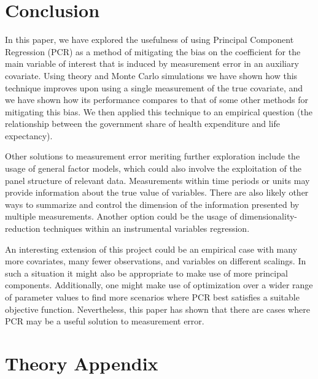 \documentclass[10pt]{article}
\begin{document}
        

    \section*{Conclusion}
        
        In this paper, we have explored the usefulness of using Principal Component Regression (PCR) as a method of mitigating the bias on the coefficient for the main variable of interest that is induced by measurement error in an auxiliary covariate. Using theory and Monte Carlo simulations we have shown how this technique improves upon using a single measurement of the true covariate, and we have shown how its performance compares to that of some other methods for mitigating this bias. We then applied this technique to an empirical question (the relationship between the government share of health expenditure and life expectancy).

        Other solutions to measurement error meriting further exploration include the usage of general factor models, which could also involve the exploitation of the panel structure of relevant data. Measurements within time periods or units may provide information about the true value of variables. There are also likely other ways to summarize and control the dimension of the information presented by multiple measurements. Another option could be the usage of dimensionality-reduction techniques within an instrumental variables regression.

        An interesting extension of this project could be an empirical case with many more covariates, many fewer observations, and variables on different scalings. In such a situation it might also be appropriate to make use of more principal components. Additionally, one might make use of optimization over a wider range of parameter values to find more scenarios where PCR best satisfies a suitable objective function. Nevertheless, this paper has shown that there are cases where PCR may be a useful solution to measurement error.

    \clearpage \newpage

    
    

    \clearpage \newpage

    \appendix

	\section*{Theory Appendix}
\end{document}
